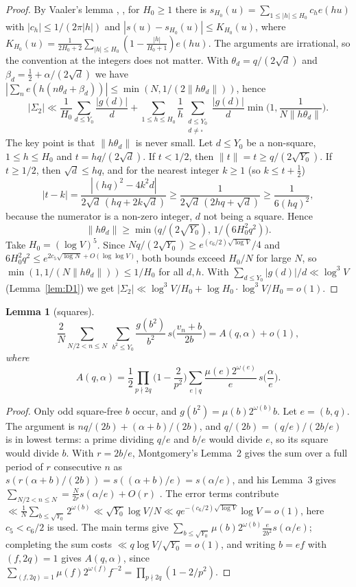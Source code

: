 \documentclass[11pt]{amsart}
\newtheorem{lemma}{Lemma}
\theoremstyle{remark}
\begin{document}
\begin{proof}
By Vaaler's lemma \cite{Va}, \cite[Thm.~A.6]{GK}, for $H_0\ge1$ there is $s_{H_0}(u)=\sum_{1\le|h|\le H_0}c_he(hu)$ with $|c_h|\le1/(2\pi|h|)$ and $|s(u)-s_{H_0}(u)|\le K_{H_0}(u)$, where $K_{H_0}(u)=\frac1{2H_0+2}\sum_{|h|\le H_0}(1-\frac{|h|}{H_0+1})e(hu)$. The arguments are irrational, so the convention at the integers does not matter. With $\theta_d=q/(2\sqrt d)$ and $\beta_d=\frac12+\alpha/(2\sqrt d)$ we have $|\sum_ne(h(n\theta_d+\beta_d))|\le\min(N,1/(2\|h\theta_d\|))$, hence
\[
|\Sigma_2|\ll\frac1{H_0}\sum_{d\le Y_0}\frac{|g(d)|}d+\sum_{1\le h\le H_0}\frac1h\sum_{\substack{d\le Y_0\\ d\neq\square}}\frac{|g(d)|}d\min\Big(1,\frac1{N\|h\theta_d\|}\Big).
\]
The key point is that $\|h\theta_d\|$ is never small. Let $d\le Y_0$ be a non-square, $1\le h\le H_0$ and $t=hq/(2\sqrt d)$. If $t<1/2$, then $\|t\|=t\ge q/(2\sqrt{Y_0})$. If $t\ge1/2$, then $\sqrt d\le hq$, and for the nearest integer $k\ge1$ (so $k\le t+\frac12$)
\[
|t-k|=\frac{|(hq)^2-4k^2d|}{2\sqrt d\,(hq+2k\sqrt d)}\ge\frac1{2\sqrt d\,(2hq+\sqrt d)}\ge\frac1{6(hq)^2},
\]
because the numerator is a non-zero integer, $d$ not being a square. Hence
\[
\|h\theta_d\|\ge\min\big(q/(2\sqrt{Y_0}),\,1/(6H_0^2q^2)\big).
\]
 Take $H_0=(\log V)^5$. Since $Nq/(2\sqrt{Y_0})\ge e^{(c_6/2)\sqrt{\log V}}/4$ and $6H_0^2q^2\le e^{2c_5\sqrt{\log N}+O(\log\log V)}$, both bounds exceed $H_0/N$ for large $N$, so $\min(1,1/(N\|h\theta_d\|))\le1/H_0$ for all $d,h$. With $\sum_{d\le Y_0}|g(d)|/d\ll\log^3V$ (Lemma~\ref{lem:D1}) we get $|\Sigma_2|\ll\log^3V/H_0+\log H_0\cdot\log^3V/H_0=o(1)$.
\end{proof}

\begin{lemma}[squares]\label{lem:D3}
\[
\frac2N\sum_{N/2<n\le N}\ \sum_{b^2\le Y_0}\frac{g(b^2)}{b^2}\,s\Big(\frac{v_n+b}{2b}\Big)=A(q,\alpha)+o(1),
\]
where
\[
A(q,\alpha)=\frac12\prod_{p\nmid2q}\Big(1-\frac2{p^2}\Big)\sum_{e\mid q}\frac{\mu(e)2^{\omega(e)}}e\,s\Big(\frac\alpha e\Big).
\]
\end{lemma}

\begin{proof}
Only odd square-free $b$ occur, and $g(b^2)=\mu(b)2^{\omega(b)}b$. Let $e=(b,q)$. The argument is $nq/(2b)+(\alpha+b)/(2b)$, and $q/(2b)=(q/e)/(2b/e)$ is in lowest terms: a prime dividing $q/e$ and $b/e$ would divide $e$, so its square would divide $b$. With $r=2b/e$, Montgomery's Lemma~2 gives the sum over a full period of $r$ consecutive $n$ as $s(r(\alpha+b)/(2b))=s((\alpha+b)/e)=s(\alpha/e)$, and his Lemma~3 gives $\sum_{N/2<n\le N}=\frac N{2r}s(\alpha/e)+O(r)$ \cite[Lemmas~2,~3]{Mo}. The error terms contribute $\ll\frac1N\sum_{b\le\sqrt{Y_0}}2^{\omega(b)}\ll\sqrt{Y_0}\log V/N\ll qe^{-(c_6/2)\sqrt{\log V}}\log V=o(1)$, here $c_5<c_6/2$ is used. The main terms give $\sum_{b\le\sqrt{Y_0}}\mu(b)2^{\omega(b)}\frac e{2b^2}s(\alpha/e)$; completing the sum costs $\ll q\log V/\sqrt{Y_0}=o(1)$, and writing $b=ef$ with $(f,2q)=1$ gives $A(q,\alpha)$, since $\sum_{(f,2q)=1}\mu(f)2^{\omega(f)}f^{-2}=\prod_{p\nmid2q}(1-2/p^2)$.
\end{proof}
\end{document}
